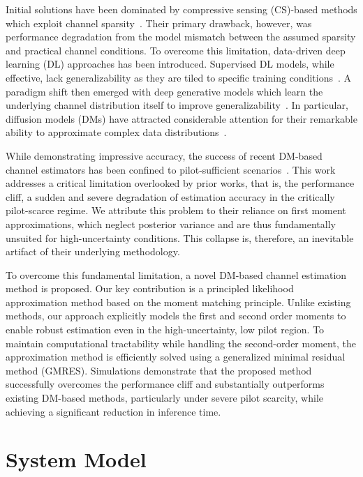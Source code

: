 \documentclass[lettersize,journal]{IEEEtran}
\begin{document}
Initial solutions have been dominated by compressive sensing (CS)-based methods which exploit channel sparsity~\cite{zhangAtomicNormDenoisingBased2018,choiCompressedSensingWireless2017}. Their primary drawback, however, was performance degradation from the model mismatch between the assumed sparsity and practical channel conditions. To overcome this limitation, data-driven deep learning (DL) approaches has been introduced. Supervised DL models, while effective, lack generalizability as they are tiled to specific training conditions~\cite{heDeepLearningBasedChannel2018}. A paradigm shift then emerged with deep generative models which learn the underlying channel distribution itself to improve generalizability~\cite{vanhuynhGenerativeAIPhysical2024}. In particular, diffusion models (DMs) have attracted considerable attention for their remarkable ability to approximate complex data distributions~\cite{hoDenoisingDiffusionProbabilistic2020}.

While demonstrating impressive accuracy, the success of recent DM-based channel estimators has been confined to pilot-sufficient scenarios~\cite{arvinteMIMOChannelEstimation2023,zhouGenerativeDiffusionModels2025}. This work addresses a critical limitation overlooked by prior works, that is, the performance cliff, a sudden and severe degradation of estimation accuracy in the critically pilot-scarce regime. We attribute this problem to their reliance on first moment approximations, which neglect posterior variance and are thus fundamentally unsuited for high-uncertainty conditions. This collapse is, therefore, an inevitable artifact of their underlying methodology.

To overcome this fundamental limitation, a novel DM-based channel estimation method is proposed. Our key contribution is a principled likelihood approximation method based on the moment matching principle. Unlike existing methods, our approach explicitly models the first and second order moments to enable robust estimation even in the high-uncertainty, low pilot region. To maintain computational tractability while handling the second-order moment, the approximation method is efficiently solved using a generalized minimal residual method (GMRES). Simulations demonstrate that the proposed method successfully overcomes the performance cliff and substantially outperforms existing DM-based methods, particularly under severe pilot scarcity, while achieving a significant reduction in inference time.

\section{System Model}
\end{document}
